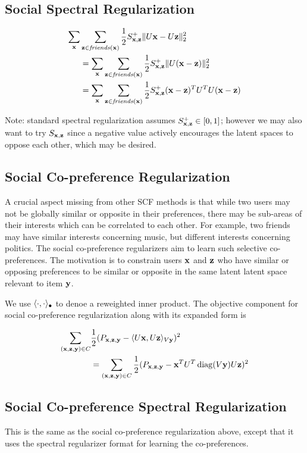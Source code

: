 \subsection{Social Spectral Regularization}
\begin{align}
\sum_{\mathbf{x}} & \sum_{\mathbf{z} \in \mathit{friends}(\mathbf{x})} \frac{1}{2} S^+_{\mathbf{x},\mathbf{z}} \| U\mathbf{x} - U\mathbf{z} \|_2^2 \nonumber \\
& = \sum_{\mathbf{x}} \sum_{\mathbf{z} \in \mathit{friends}(\mathbf{x})} \frac{1}{2} S^+_{\mathbf{x},\mathbf{z}} \| U (\mathbf{x} - \mathbf{z}) \|_2^2 \nonumber \\
& = \sum_{\mathbf{x}} \sum_{\mathbf{z} \in \mathit{friends}(\mathbf{x})} \frac{1}{2} S^+_{\mathbf{x},\mathbf{z}} (\mathbf{x} - \mathbf{z})^T U^T U (\mathbf{x} - \mathbf{z})
\end{align}

\subfive Note: standard spectral regularization assumes $S^+_{\mathbf{x},\mathbf{z}} \in [0,1]$;
however we may also want to try $S_{\mathbf{x},\mathbf{z}}$ since a negative value actively
encourages the latent spaces to oppose each other, which may be desired.

\subsection{Social Co-preference Regularization}

A crucial aspect missing from other SCF methods is that while two users may not be globally similar or opposite 
in their preferences, there may be sub-areas of their interests which can be correlated to each other.
For example, two friends may have similar interests concerning music, but 
different interests concerning politics.  The social co-preference regularizers
aim to learn such selective co-preferences. The motivation is to constrain users $\mathbf{x}$
and $\mathbf{z}$ who have similar or opposing
preferences to be similar or opposite in the same latent latent space
relevant to item $\mathbf{y}$.  

We use $\langle \cdot, \cdot \rangle_{\bullet}$ to denoe a reweighted inner product. The objective component for 
social co-preference regularization along with its expanded form is

\begin{align}
\sum_{(\mathbf{x},\mathbf{z},\mathbf{y}) \in C} & \frac{1}{2} (P_{\mathbf{x},\mathbf{z},\mathbf{y}} - \langle U\mathbf{x}, U\mathbf{z} \rangle_{V\mathbf{y}})^2 \nonumber \\
& = \sum_{(\mathbf{x},\mathbf{z},\mathbf{y}) \in C} \frac{1}{2} (P_{\mathbf{x},\mathbf{z},\mathbf{y}} - \mathbf{x}^T U^T \operatorname{diag}(V\mathbf{y}) U \mathbf{z})^2
\end{align}


\subsection{Social Co-preference Spectral Regularization}
This is the same as the social co-preference regularization above, except that it uses the spectral regularizer format for 
learning the co-preferences.

